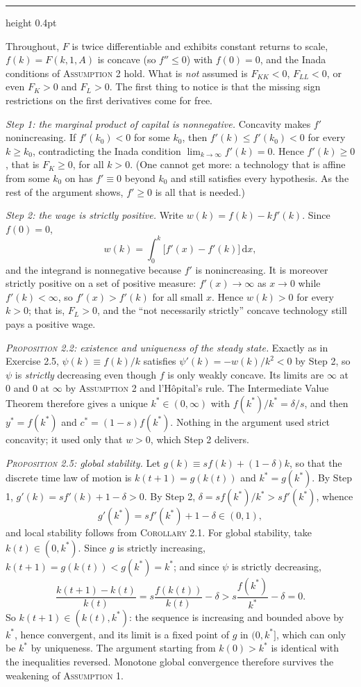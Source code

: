 \documentclass[11pt,letterpaper,reqno]{amsart}
\makeatletter
\newcommand{\dd}{\,\mathrm{d}}
\newcommand{\as@head}[3]{%
  \par\addvspace{1.6ex}\penalty-200\relax
  \phantomsection
  \addcontentsline{toc}{subsection}{#1 #2\texorpdfstring{\ifx\relax#3\relax\else\quad #3\fi}{}}%
  {\color{RuleGrey}\hrule height 0.4pt}%
  \nobreak\vspace{0.8ex}\nobreak
  \noindent{\bfseries #1 #2}%
  \ifx\relax#3\relax\else\quad{\bfseries\itshape #3}\fi
  \par\nobreak\vspace{0.4ex}\nobreak
  \as@beginstatement
}
\newcommand{\as@beginstatement}{\begingroup\itshape\ignorespaces}
\newenvironment{aex}[2]{\as@head{Exercise}{#1}{#2}}{\par\addvspace{1.2ex}}
\newcommand{\bk}[1]{\textup{\textsc{#1}}}
\renewcommand{\as@beginstatement}{\ignorespaces}
\makeatother
\begin{document}
\begin{aex}{2.8}{}
Throughout, $F$ is twice differentiable and exhibits constant returns to scale, $f(k)=F(k,1,A)$ is concave
(so $f''\le0$) with $f(0)=0$, and the Inada conditions of \bk{Assumption 2} hold.  What is \emph{not}
assumed is $F_{KK}<0$, $F_{LL}<0$, or even $F_K>0$ and $F_L>0$.  The first thing to notice is that the
missing sign restrictions on the first derivatives come for free.

\emph{Step 1: the marginal product of capital is nonnegative.}  Concavity makes $f'$ nonincreasing.  If
$f'(k_0)<0$ for some $k_0$, then $f'(k)\le f'(k_0)<0$ for every $k\ge k_0$, contradicting the Inada
condition $\lim_{k\to\infty}f'(k)=0$.  Hence $f'(k)\ge0$, that is $F_K\ge0$, for all $k>0$.  (One cannot
get more: a technology that is affine from some $k_0$ on has $f'\equiv0$ beyond $k_0$ and still satisfies
every hypothesis.  As the rest of the argument shows, $f'\ge0$ is all that is needed.)

\emph{Step 2: the wage is strictly positive.}  Write $w(k)=f(k)-kf'(k)$.  Since $f(0)=0$,
\[
w(k)=\int_0^k\bigl[f'(x)-f'(k)\bigr]\dd x ,
\]
and the integrand is nonnegative because $f'$ is nonincreasing.  It is moreover strictly positive on a set
of positive measure: $f'(x)\to\infty$ as $x\to0$ while $f'(k)<\infty$, so $f'(x)>f'(k)$ for all small $x$.
Hence $w(k)>0$ for every $k>0$; that is, $F_L>0$, and the ``not necessarily strictly'' concave technology
still pays a positive wage.

\emph{\bk{Proposition 2.2}: existence and uniqueness of the steady state.}  Exactly as in Exercise 2.5,
$\psi(k)\equiv f(k)/k$ satisfies $\psi'(k)=-w(k)/k^2<0$ by Step 2, so $\psi$ is \emph{strictly} decreasing
even though $f$ is only weakly concave.  Its limits are $\infty$ at $0$ and $0$ at $\infty$ by
\bk{Assumption 2} and l'H\^opital's rule.  The Intermediate Value Theorem therefore gives a unique
$k^*\in(0,\infty)$ with $f(k^*)/k^*=\delta/s$, and then $y^*=f(k^*)$ and $c^*=(1-s)f(k^*)$.  Nothing in the
argument used strict concavity; it used only that $w>0$, which Step 2 delivers.

\emph{\bk{Proposition 2.5}: global stability.}  Let $g(k)\equiv sf(k)+(1-\delta)k$, so that the discrete
time law of motion is $k(t+1)=g(k(t))$ and $k^*=g(k^*)$.  By Step 1, $g'(k)=sf'(k)+1-\delta>0$.  By Step 2,
$\delta=sf(k^*)/k^*>sf'(k^*)$, whence
\[
g'(k^*)=sf'(k^*)+1-\delta\in(0,1),
\]
and local stability follows from \bk{Corollary 2.1}.  For global stability, take $k(t)\in(0,k^*)$.  Since
$g$ is strictly increasing, $k(t+1)=g(k(t))<g(k^*)=k^*$; and since $\psi$ is strictly decreasing,
\[
\frac{k(t+1)-k(t)}{k(t)}=s\frac{f(k(t))}{k(t)}-\delta>s\frac{f(k^*)}{k^*}-\delta=0 .
\]
So $k(t+1)\in(k(t),k^*)$: the sequence is increasing and bounded above by $k^*$, hence convergent, and its
limit is a fixed point of $g$ in $(0,k^*]$, which can only be $k^*$ by uniqueness.  The argument starting
from $k(0)>k^*$ is identical with the inequalities reversed.  Monotone global convergence therefore
survives the weakening of \bk{Assumption 1}.


\end{aex}
\end{document}
